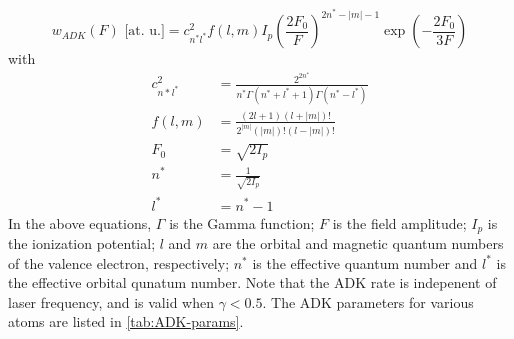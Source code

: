 

\begin{equation}
w_{ADK}(F) \textrm{ [at. u.]} = c^2_{n^*l^*} f(l,m) I_p \left( \frac{2F_0}{F} \right)^{2n^*-|m|-1} \exp \left( - \frac{2 F_0}{3F} \right)
\label{eqn:ADK-rate}
\end{equation}
with
\begin{align}
c_{n*l^*}^2 &= \frac{2^{2n^*}}{n^* \Gamma(n^* + l^* + 1) \Gamma(n^* - l^*)}  \\
f(l,m) &= \frac{(2l+1)(l+|m|)!}{2^{|m|} (|m|)! (l-|m|)!}\\
F_0 &= \sqrt{2 I_p} \\
n^* &= \frac{1}{\sqrt{2I_p}}\\
l^* &= n^* - 1
\end{align}
In the above equations, $\Gamma$ is the Gamma function; $F$ is the field amplitude; $I_p$ is the ionization potential; $l$ and $m$ are the orbital and magnetic quantum numbers of the valence electron, respectively; $n^*$ is the effective quantum number and $l^*$ is the effective orbital qunatum number. Note that the ADK rate is indepenent of laser frequency, and is valid when $\gamma < 0.5$. The ADK parameters for various atoms are listed in \cref{tab:ADK-params}.

